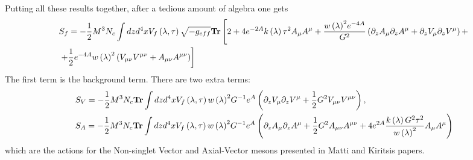 \documentclass[a4paper,12pt]{article}
\begin{document}
Putting all these results together, after a tedious amount of algebra one gets
\begin{align}
&S_f = - \frac{1}{2} M^3 N_c \int dz d^4 x V_f \left(\lambda, \tau \right) \sqrt{- g_{eff}} \bold{Tr} \left[ 2 + 4 e^{-2A} k\left( \lambda \right) \tau^2 A_\mu A^\mu + \frac{{w\left(\lambda\right)}^2 e^{-4A}}{G^2} \left( \partial_z A_\mu \partial_z A^\mu +  \partial_z V_\mu \partial_z V^\mu \right) + \right. \\
&\left. + \frac{1}{2} e^{-4A} {w\left(\lambda\right)}^2 \left( V_{\mu \nu}V^{\mu \nu} + A_{\mu \nu} A^{\mu \nu} \right) \right]
\end{align}
The first term is the background term. There are two extra terms:
\begin{align}
\label{eq:VM_action}
&S_V = - \frac{1}{2} M^3 N_c \bold{Tr} \int dz d^4x V_{f} \left( \lambda, \tau \right) {w\left(\lambda\right)}^2 G^{-1} e^{A} \left( \partial_z V_\mu \partial_z V^\mu + \frac{1}{2} G^2 V_{\mu \nu} V^{\mu \nu} \right), \\
& S_A = - \frac{1}{2} M^3 N_c \bold{Tr} \int dz d^4 x V_{f} \left( \lambda, \tau \right) {w\left(\lambda\right)}^2 G^{-1} e^{A} \left( \partial_z A_\mu \partial_z A^\mu + \frac{1}{2} G^2 A_{\mu \nu} A^{\mu \nu} + 4 e^{2A} \frac{k\left(\lambda\right) G^2 \tau^2}{{w\left(\lambda\right)}^2} A_\mu A^\mu \right)
\end{align}
which are the actions for the Non-singlet Vector and Axial-Vector mesons presented in Matti and Kiritsis papers.
\end{document}
